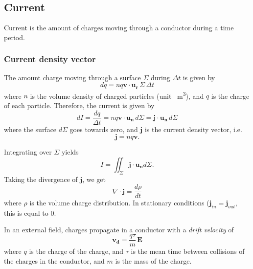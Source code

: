 \documentclass[a4paper, 12pt]{article}
\renewcommand{\vec}[1]{\mathbf{#1}}
\newcommand{\E}{\ensuremath{\vec{E}}}
\renewcommand{\j}{\ensuremath{\vec{j}}}
\begin{document}
\subsection{Current}
    Current is the amount of charges moving through a conductor during a time period. 
    \subsubsection{Current density vector}
        The amount charge moving through a surface $\Sigma$ during $\Delta t$ is given by
        \begin{equation}
            dq = nq\vec{v}\cdot \vec{u_r}\,\Sigma \,\Delta t
        \end{equation}
        where $n$ is the volume density of charged particles (unit \si{\per\metre\cubed}), and $q$ is the charge of each particle.
        Therefore, the current is given by
        \begin{equation}
            dI = \frac{dq}{\Delta t} = nq\vec{v}\cdot\vec{u_n}\,d\Sigma = \j\cdot\vec{u_n}\,d\Sigma
        \end{equation}
        where the surface $d\Sigma$ goes towards zero, and $\j$ is the current density vector, i.e.
        \begin{equation}
            \j = nq\vec{v}.
        \end{equation}
        
        Integrating over $\Sigma$ yields
        \begin{equation}
            I = \iint_\Sigma \j\cdot\vec{u_n}d\Sigma.
        \end{equation}
        Taking the divergence of $\j$, we get
        \begin{equation}
            \nabla \cdot \j = \frac{d\rho}{dt}
        \end{equation}
        where $\rho$ is the volume charge distribution.
        In stationary conditions ($\j_{in} = \j_{out}$, this is equal to 0. 
    
        In an external field, charges propagate in a conductor with a \textit{drift velocity} of
        \begin{equation}
            \vec{v_d} = \frac{q\tau}{m}\,\E
        \end{equation}
        where $q$ is the charge of the charge, and $\tau$ is the mean time between collisions of the charges in the conductor, and $m$ is the mass of the charge.
        
\end{document}
